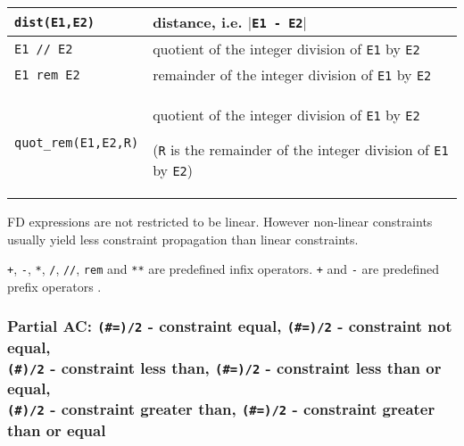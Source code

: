 \begin{tabular}{|l|L{10cm}|}
\texttt{dist(E1,E2)} & distance, i.e. $|$\texttt{E1 - E2$|$} \\

\hline

\texttt{E1 // E2} & quotient of the integer division of \texttt{E1} by
\texttt{E2} \\

\hline

\texttt{E1 rem E2} & remainder of the integer division of \texttt{E1} by
\texttt{E2} \\

\hline

\texttt{quot\_rem(E1,E2,R)} & quotient of the integer division of
\texttt{E1} by \texttt{E2}

(\texttt{R} is the remainder of the integer division of \texttt{E1} by
\texttt{E2}) \\

\hline
\end{tabular}

FD expressions are not restricted to be linear. However non-linear
constraints usually yield less constraint propagation than linear
constraints.

\texttt{+}, \texttt{-}, \texttt{*}, \texttt{/}, \texttt{//}, \texttt{rem}
and \texttt{**} are predefined infix operators. \texttt{+} and \texttt{-}
are predefined prefix operators .

\begin{PlErrors}




\end{PlErrors}

\subsubsection{Partial AC: \texttt{(\#=)/2} - constraint equal,
\texttt{(\#{\bs}=)/2} - constraint not equal, \\
\texttt{(\#{\lt})/2} - constraint less than,
\texttt{(\#={\lt})/2} - constraint less than or equal, \\
\texttt{(\#{\gt})/2} - constraint greater than,
\texttt{(\#{\gt}=)/2} - constraint greater than or equal}
\label{Partial-AC:-(:=)/2}

